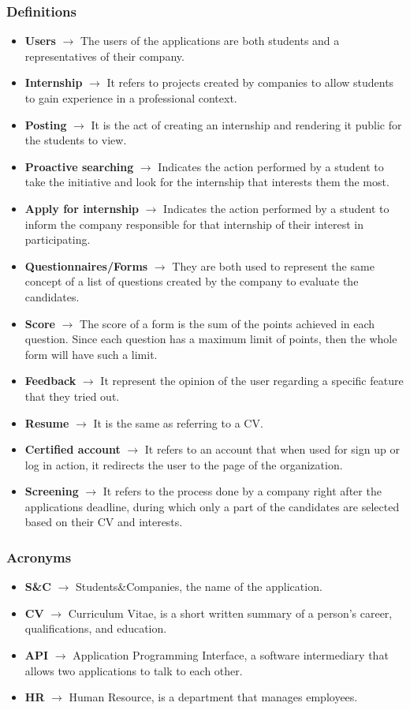 \documentclass[11pt,twoside]{article}
\begin{document}
		\subsubsection{Definitions}
\begin{itemize}
\item \textbf{Users} $\rightarrow$ The users of the applications are both students and a representatives of their company.
\item \textbf{Internship} $\rightarrow$ It refers to projects created by companies to allow students to gain experience in a professional context.
\item \textbf{Posting} $\rightarrow$ It is the act of creating an internship and rendering it public for the students to view.
\item \textbf{Proactive searching} $\rightarrow$ Indicates the action performed by a student to take the initiative and look for the internship that interests them the most.
\item \textbf{Apply for internship} $\rightarrow$ Indicates the action performed by a student to inform the company responsible for that internship of their interest in participating.
\item \textbf{Questionnaires/Forms} $\rightarrow$ They are both used to represent the same concept of a list of questions created by the company to evaluate the candidates.
\item \textbf{Score} $\rightarrow$ The score of a form is the sum of the points achieved in each question. Since each question has a maximum limit of points, then the whole form will have such a limit.
\item \textbf{Feedback} $\rightarrow$ It represent the opinion of the user regarding a specific feature that they tried out.
\item \textbf{Resume} $\rightarrow$ It is the same as referring to a CV.
\item \textbf{Certified account} $\rightarrow$ It refers to an account that when used for sign up or log in action, it redirects the user to the page of the organization.
\item \textbf{Screening} $\rightarrow$ It refers to the process done by a company right after the applications deadline, during which only a part of the candidates are selected based on their CV and interests.
\end{itemize}
		\subsubsection{Acronyms}
\begin{itemize}
\item \textbf{S\&C} $\rightarrow$ Students\&Companies, the name of the application.
\item \textbf{CV} $\rightarrow$ Curriculum Vitae, is a short written summary of a person's career, qualifications, and education.
\item \textbf{API} $\rightarrow$ Application Programming Interface, a software intermediary that allows two applications to talk to each other.
\item \textbf{HR} $\rightarrow$ Human Resource, is a department that manages employees.
\end{itemize}
\end{document}
